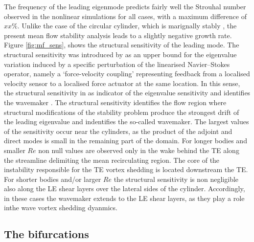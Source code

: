 The frequency of the leading eigenmode predicts fairly well the Strouhal number observed in the nonlinear simulations for all cases, with a maximum difference of $xx\%$. Unlike the case of the circular cylinder, which is marignally stably \citep{barkley-2006}, the present mean flow stability analysis leads to a slightly negative growth rate. Figure \ref{fig:mf_sens}, shows the structural sensitivity of the leading mode. The structural sensitivity was introduced by \cite{giannetti-luchini-2007} as an upper bound for the eigenvalue variation induced by a specific perturbation of the linearised Navier--Stokes operator, namely a `force-velocity coupling' representing feedback from a localised velocity sensor to a localised force actuator at the same location. In this sense, the structural sensitivity in as indicator of the eigenvalue sensitivity and identifies the wavemaker \citep{monkewitz-etal-1993}. The structural sensitivity identifies the flow region where structural modifications of the stability problem produce the strongest drift of the leading eigenvalue and indentifies the so-called wavemaker. The largest values of the sensitivity occur near the cylinders, as the product of the adjoint and direct modes is small in the remaining part of the domain. For longer bodies and smaller $Re$ non null values are observed only in the wake behind the TE along the streamline delimiting the mean recirculating region. The core of the instability responsible for the TE vortex shedding is located downstream the TE. For shorter bodies and/or larger $Re$ the structural sensitivity is non negligible also along the LE shear layers over the lateral sides of the cylinder. Accordingly, in these cases the wavemaker extends to the LE shear layers, as they play a role inthe wave vortex shedding dyanmics.
\fi

\subsection{The bifurcations}


